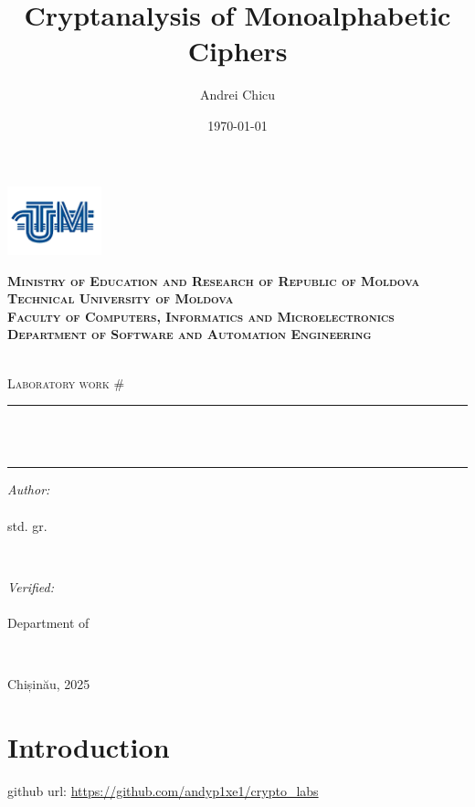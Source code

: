 \documentclass[a4paper,12pt]{article}
\author{Andrei Chicu}
\date{\today}
\title{Cryptanalysis of Monoalphabetic Ciphers}
\begin{document}
\makeatletter
\begin{titlepage}
\centering

\includegraphics[height=2cm]{utm_logo.png}

\bfseries
\textsc{Ministry of Education and Research of Republic of Moldova} \\
\textsc{Technical University of Moldova} \\
\textsc{Faculty of Computers, Informatics and Microelectronics} \\
\textsc{Department of Software and Automation Engineering} \\
\mdseries

\vfill

\textsc{\Large \@labsubject} \\
\textsc{\large Laboratory work \#\@labno}\\[0.5cm]

\vspace{12pt}
\newcommand{\HRule}{\rule{\linewidth}{0.5mm}}
\HRule \\[0.2cm]
{ \LARGE \bfseries \@title }\\[0.4cm]
\HRule
\vfill

\begin{minipage}[t]{0.4\textwidth}
\begin{flushleft} \large
\emph{Author:} \\
\@author\\                        
std. gr. \@group
\end{flushleft}
\end{minipage}
~
\begin{minipage}[t]{0.4\textwidth}
\raggedleft \large
\emph{Verified:} \\
\@prof \\
Department of \textsc{\@profdep}
\end{minipage}\\[3cm]
\vfill

Chișinău, 2025
\end{titlepage}
\makeatother
\setcounter{page}{2}
\section{Introduction}
\label{sec:orga1bc16b}
github url: \url{https://github.com/andyp1xe1/crypto_labs}
\end{document}
